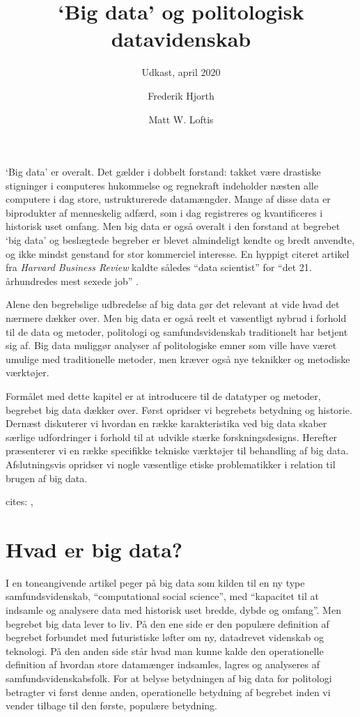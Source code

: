 \documentclass[12pt,]{article}
\title{`Big data' og politologisk datavidenskab}
\subtitle{Udkast, april 2020}
\author{Frederik Hjorth \and Matt W. Loftis}
\date{}
\begin{document}
\maketitle

`Big data' er overalt. Det gælder i dobbelt forstand: takket være
drastiske stigninger i computeres hukommelse og regnekraft indeholder
næsten alle computere i dag store, ustrukturerede datamængder. Mange af
disse data er biprodukter af menneskelig adfærd, som i dag registreres
og kvantificeres i historisk uset omfang. Men big data er også overalt i
den forstand at begrebet `big data' og beslægtede begreber er blevet
almindeligt kendte og bredt anvendte, og ikke mindst genstand for stor
kommerciel interesse. En hyppigt citeret artikel fra \emph{Harvard
Business Review} kaldte således ``data scientist'' for ``det 21.
århundredes mest sexede job'' \citep{davenport2012data}.

Alene den begrebslige udbredelse af big data gør det relevant at vide
hvad det nærmere dækker over. Men big data er også reelt et væsentligt
nybrud i forhold til de data og metoder, politologi og samfundsvidenskab
traditionelt har betjent sig af. Big data muliggør analyser af
politologiske emner som ville have været umulige med traditionelle
metoder, men kræver også nye teknikker og metodiske værktøjer.

Formålet med dette kapitel er at introducere til de datatyper og
metoder, begrebet big data dækker over. Først opridser vi begrebets
betydning og historie. Dernæst diskuterer vi hvordan en række
karakteristika ved big data skaber særlige udfordringer i forhold til at
udvikle stærke forskningsdesigns. Herefter præsenterer vi en række
specifikke tekniske værktøjer til behandling af big data. Afslutningsvis
opridser vi nogle væsentlige etiske problematikker i relation til brugen
af big data.

cites: \citet{mullainathan2017machine}, \citet{varian2014big}

\hypertarget{hvad-er-big-data}{%
\section{Hvad er big data?}\label{hvad-er-big-data}}

I en toneangivende artikel peger \citet{lazeretal} på big data som
kilden til en ny type samfundsvidenskab, ``computational social
science'', med ``kapacitet til at indsamle og analysere data med
historisk uset bredde, dybde og omfang''. Men begrebet big data lever to
liv. På den ene side er den populære definition af begrebet forbundet
med futuristiske løfter om ny, datadrevet videnskab og teknologi. På den
anden side står hvad man kunne kalde den operationelle definition af
hvordan store datamænger indsamles, lagres og analyseres af
samfundsvidenskabsfolk. For at belyse betydningen af big data for
politologi betragter vi først denne anden, operationelle betydning af
begrebet inden vi vender tilbage til den første, populære betydning.
\end{document}
